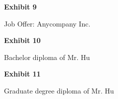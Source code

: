 \documentclass{article}
\begin{document}
% 


\vspace*{\fill}
\begin{center}

{\LARGE \bf
Exhibit 9
}

\vspace{10\baselineskip}

{\large Job Offer: Anycompany Inc.}

\end{center}
\vspace*{\fill}

% 




\vspace*{\fill}
\begin{center}

{\LARGE \bf
Exhibit 10
}

\vspace{10\baselineskip}

{\large Bachelor diploma of Mr. Hu}

\end{center}
\vspace*{\fill}

% 

% 


\vspace*{\fill}
\begin{center}

{\LARGE \bf
Exhibit 11
}

\vspace{10\baselineskip}

{\large Graduate degree diploma of Mr. Hu}

\end{center}
\vspace*{\fill}

% 

% 

% 
\end{document}
